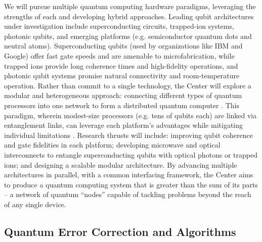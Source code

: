 \documentclass[12pt]{article}
\begin{document}
We will pursue multiple quantum computing hardware paradigms, leveraging the strengths of each and developing hybrid approaches. Leading qubit architectures under investigation include superconducting circuits, trapped-ion systems, photonic qubits, and emerging platforms (e.g. semiconductor quantum dots and neutral atoms). Superconducting qubits (used by organizations like IBM and Google) offer fast gate speeds and are amenable to microfabrication, while trapped ions provide long coherence times and high-fidelity operations, and photonic qubit systems promise natural connectivity and room-temperature operation. Rather than commit to a single technology, the Center will explore a modular and heterogeneous approach: connecting different types of quantum processors into one network to form a distributed quantum computer . This paradigm, wherein modest-size processors (e.g. tens of qubits each) are linked via entanglement links, can leverage each platform’s advantages while mitigating individual limitations . Research thrusts will include: improving qubit coherence and gate fidelities in each platform; developing microwave and optical interconnects to entangle superconducting qubits with optical photons or trapped ions; and designing a scalable modular architecture. By advancing multiple architectures in parallel, with a common interfacing framework, the Center aims to produce a quantum computing system that is greater than the sum of its parts – a network of quantum “nodes” capable of tackling problems beyond the reach of any single device.



\subsection{Quantum Error Correction and Algorithms}
\end{document}
